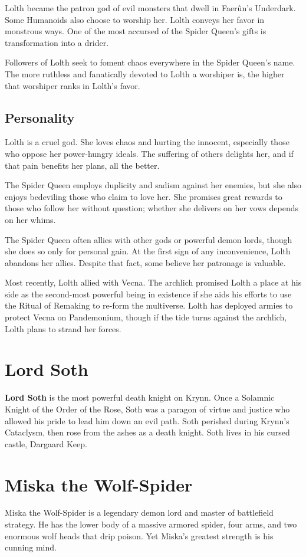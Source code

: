 \documentclass[10pt,a4paper,twoside,bg=print,twocolumn,openany,nodeprecatedcode]{dndbook}
\begin{document}
Lolth became the patron god of evil monsters that dwell in Faerûn's Underdark. Some Humanoids also choose to worship her. Lolth conveys her favor in monstrous ways. One of the most accursed of the Spider Queen's gifts is transformation into a drider.

Followers of Lolth seek to foment chaos everywhere in the Spider Queen's name. The more ruthless and fanatically devoted to Lolth a worshiper is, the higher that worshiper ranks in Lolth's favor.

\subsection{Personality}
Lolth is a cruel god. She loves chaos and hurting the innocent, especially those who oppose her power-hungry ideals. The suffering of others delights her, and if that pain benefits her plans, all the better.

The Spider Queen employs duplicity and sadism against her enemies, but she also enjoys bedeviling those who claim to love her. She promises great rewards to those who follow her without question; whether she delivers on her vows depends on her whims.

The Spider Queen often allies with other gods or powerful demon lords, though she does so only for personal gain. At the first sign of any inconvenience, Lolth abandons her allies. Despite that fact, some believe her patronage is valuable.

Most recently, Lolth allied with Vecna. The archlich promised Lolth a place at his side as the second-most powerful being in existence if she aids his efforts to use the Ritual of Remaking to re-form the multiverse. Lolth has deployed armies to protect Vecna on Pandemonium, though if the tide turns against the archlich, Lolth plans to strand her forces.

\section{Lord Soth}
\textbf{Lord Soth} is the most powerful death knight on Krynn. Once a Solamnic Knight of the Order of the Rose, Soth was a paragon of virtue and justice who allowed his pride to lead him down an evil path. Soth perished during Krynn's Cataclysm, then rose from the ashes as a death knight. Soth lives in his cursed castle, Dargaard Keep.

\section{Miska the Wolf-Spider}
Miska the Wolf-Spider is a legendary demon lord and master of battlefield strategy. He has the lower body of a massive armored spider, four arms, and two enormous wolf heads that drip poison. Yet Miska's greatest strength is his cunning mind.
\end{document}

